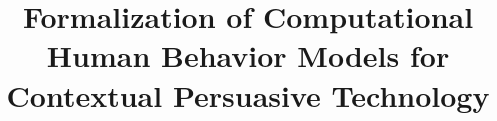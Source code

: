 \documentclass[runningheads,a4paper]{llncs}
\begin{document}
\mainmatter  %

\title{ Formalization of Computational Human Behavior Models for Contextual Persuasive Technology }


%
%



%
%

\maketitle
\end{document}

